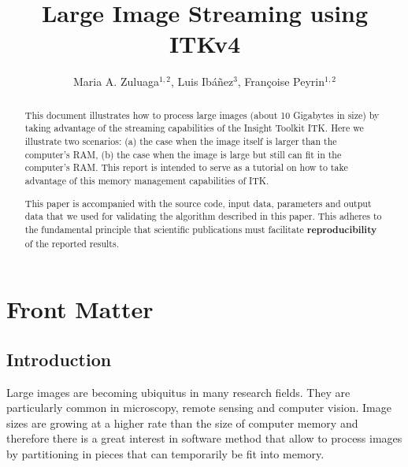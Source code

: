 \documentclass{InsightArticle}
\title{Large Image Streaming using ITKv4}
\author{Maria A. Zuluaga$^{1,2}$, Luis Ib\'{a}\~{n}ez$^{3}$, Fran\c{c}oise Peyrin$^{1,2}$}
\newcommand{\IJhandlerIDnumber}{3063}
\begin{document}
%
%
\IJhandlefooter{\IJhandlerIDnumber}


\ifpdf
\else
\fi


\maketitle


\ifhtml
\chapter*{Front Matter\label{front}}
\fi


\begin{abstract}
\noindent
This document illustrates how to process large images (about 10 Gigabytes in
size) by taking advantage of the streaming capabilities of the Insight Toolkit
ITK.  Here we illustrate two scenarios: (a) the case when the image itself is
larger than the computer's RAM, (b) the case when the image is large but still
can fit in the computer's RAM. This report is intended to serve as a tutorial
on how to take advantage of this memory management capabilities of ITK.

This paper is accompanied with the source code, input data, parameters and
output data that we used for validating the algorithm described in this paper.
This adheres to the fundamental principle that scientific publications must
facilitate \textbf{reproducibility} of the reported results.
\end{abstract}

\tableofcontents

\section{Introduction}

Large images are becoming ubiquitus in many research fields. They are
particularly common in microscopy, remote sensing and computer vision.  Image
sizes are growing at a higher rate than the size of computer memory and
therefore there is a great interest in software method that allow to process
images by partitioning in pieces that can temporarily be fit into memory.
\end{document}
